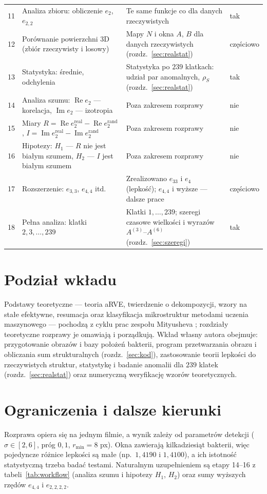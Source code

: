 \documentclass[12pt,a4paper,twoside,openright]{report}
\theoremstyle{definition}
\theoremstyle{remark}
\newcommand{\ziel}[1]{{\color{green!50!black}#1}}
\renewcommand{\Re}{\operatorname{Re}}
\renewcommand{\Im}{\operatorname{Im}}
\begin{document}
{{\begin{longtable}{@{}r >{\raggedright\arraybackslash}p{3.6cm} >{\raggedright\arraybackslash}p{6.3cm} l@{}}
11 & Analiza zbioru: obliczenie $e_2$, $e_{2,2}$ & Te same funkcje co dla danych rzeczywistych & tak\\
12 & Porównanie powierzchni 3D (zbiór rzeczywisty i losowy) & Mapy $N$ i okna $A$, $B$ dla danych rzeczywistych (rozdz.~\ref{sec:realstat}) & częściowo\\
13 & Statystyka: średnie, odchylenia & Statystyka po $239$ klatkach: udział par anomalnych, $\rho_S$ (rozdz.~\ref{sec:realstat}) & tak\\
14 & Analiza szumu: $\Re e_2$ --- korelacja, $\Im e_2$ --- izotropia & Poza zakresem rozprawy & nie\\
15 & Miary $R=\Re e_2^{\mathrm{real}}-\Re e_2^{\mathrm{rand}}$, $I=\Im e_2^{\mathrm{real}}-\Im e_2^{\mathrm{rand}}$ & Poza zakresem rozprawy & nie\\
16 & Hipotezy: $H_1$ --- $R$ nie jest białym szumem, $H_2$ --- $I$ jest białym szumem & Poza zakresem rozprawy & nie\\
17 & Rozszerzenie: $e_{3,3}$, $e_{4,4}$ itd. & Zrealizowano $e_{33}$ i $e_4$ (lepkość); $e_{4,4}$ i wyższe --- dalsze prace & częściowo\\
18 & Pełna analiza: klatki $2,3,\dots,239$ & Klatki $1,\dots,239$; \ziel{szeregi czasowe wielkości i wyrazów $A^{(3)}$--$A^{(6)}$ (rozdz.~\ref{sec:szeregi})} & tak\\
\end{longtable}}

\section{Podział wkładu}
Podstawy teoretyczne --- teoria aRVE, twierdzenie o dekompozycji, wzory na stałe efektywne, resumacja oraz klasyfikacja mikrostruktur metodami uczenia maszynowego --- pochodzą z cyklu prac zespołu Mityusheva \cite{mityushev2006representative,drygas2019applied,czapla2025computational,mityushev2025computationalpart3}; rozdziały teoretyczne rozprawy je omawiają i porządkują. Wkład własny autora obejmuje: przygotowanie obrazów i bazy położeń bakterii, program przetwarzania obrazu i obliczania sum strukturalnych (rozdz.~\ref{sec:kod}), zastosowanie teorii lepkości do rzeczywistych struktur, statystykę i badanie anomalii dla $239$ klatek (rozdz.~\ref{sec:realstat}) oraz numeryczną weryfikację wzorów teoretycznych.

\section{Ograniczenia i dalsze kierunki}
Rozprawa opiera się na jednym filmie, a wynik zależy od parametrów detekcji ($\sigma\in[2,6]$, próg $0{,}1$, $r_{\min}=8$ px). Okna zawierają kilkadziesiąt bakterii, więc pojedyncze różnice lepkości są małe (np.\ $1{,}4190$ i $1{,}4100$), a ich istotność statystyczną trzeba badać testami. Naturalnym uzupełnieniem są etapy 14--16 z tabeli~\ref{tab:workflow} (analiza szumu i hipotezy $H_1$, $H_2$) oraz sumy wyższych rzędów $e_{4,4}$ i $e_{2,2,2,2}$.
}
\end{document}
